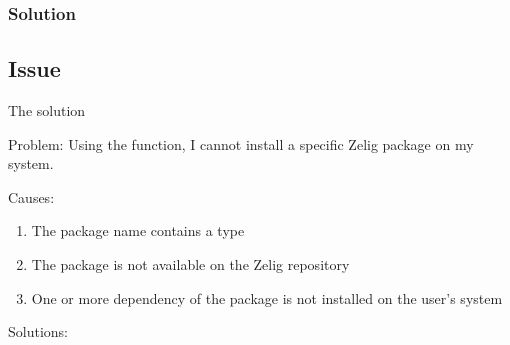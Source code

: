 \subsubsection{Solution}


% 
% 
% 
% 
\subsection{Issue}
% 
% 
% 
% 
% 
% 

The solution


Problem: Using the  function, I cannot install a specific Zelig package on my system.


Causes:

\begin{enumerate}
  \item The package name contains a type
  \item The package is not available on the Zelig repository
  \item One or more dependency of the package is not installed on the user's system
\end{enumerate}

Solutions:
